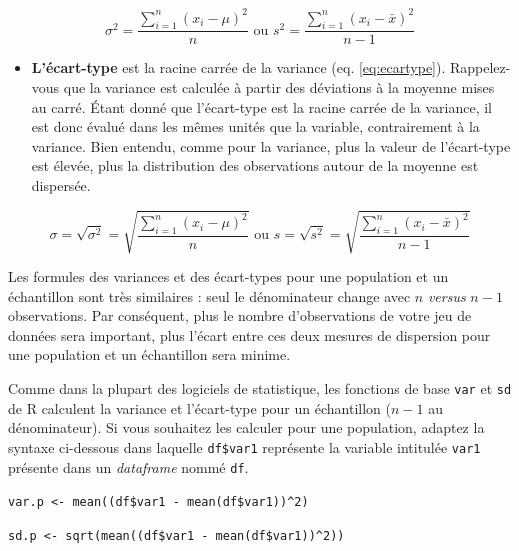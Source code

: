 \documentclass[
  11pt,
  french,
]{book}
\makeatletter
\providecommand{\tightlist}{%
  \setlength{\itemsep}{0pt}\setlength{\parskip}{0pt}}
\newenvironment{kframev}{%
\medskip{}
\setlength{\fboxsep}{.8em}
 \def\at@end@of@kframev{}%
 \ifinner\ifhmode%
  \def\at@end@of@kframev{\end{minipage}}%
  \begin{minipage}{\columnwidth}%
 \fi\fi%
 \def\FrameCommand##1{\hskip\@totalleftmargin \hskip-\fboxsep
 \colorbox{shadebluecolor}{##1}\hskip-\fboxsep
     \hskip-\linewidth \hskip-\@totalleftmargin \hskip\columnwidth}%
 \MakeFramed {\advance\hsize-\width
   \@totalleftmargin\z@ \linewidth\hsize
   \@setminipage}}%
 {\par\unskip\endMakeFramed%
 \at@end@of@kframev}
\newenvironment{rmdblock}[1]
  {
  \begin{itemize}
  \renewcommand{\labelitemi}{
    \raisebox{-.7\height}[0pt][0pt]{
      {\setkeys{Gin}{width=3em,keepaspectratio}\texttt{[image: images/\#1]}}
    }
  }
  \setlength{\fboxsep}{1em}
  \begin{kframev}
  \small
  \item
  }
  {
  \end{kframev}
  \end{itemize}
  }
\newenvironment{bloc_notes}
  {\begin{rmdblock}{notes}}
  {\end{rmdblock}}
\makeatother
\begin{document}
\footnotesize

\begin{equation}  
\sigma^2=\frac{\sum_{i=1}^n (x_{i}-\mu)^2}{n} \text{ ou } s^2=\frac{\sum_{i=1}^n (x_{i}-\bar{x})^2}{n-1}
\label{eq:variance}
\end{equation}
\normalsize

\begin{itemize}
\tightlist
\item
  \textbf{L'écart-type} est la racine carrée de la variance (eq. \eqref{eq:ecartype}). Rappelez-vous que la variance est calculée à partir des déviations à la moyenne mises au carré. Étant donné que l'écart-type est la racine carrée de la variance, il est donc évalué dans les mêmes unités que la variable, contrairement à la variance. Bien entendu, comme pour la variance, plus la valeur de l'écart-type est élevée, plus la distribution des observations autour de la moyenne est dispersée.
\end{itemize}

\footnotesize

\begin{equation}  
\sigma=\sqrt{\sigma^2}=\sqrt{\frac{\sum_{i=1}^n (x_{i}-\mu)^2}{n}} \text{ ou } s=\sqrt{s^2}=\sqrt{\frac{\sum_{i=1}^n (x_{i}-\bar{x})^2}{n-1}}
\label{eq:ecartype}
\end{equation}
\normalsize

\begin{bloc_notes}
Les formules des variances et des écart-types pour une population et un échantillon sont très similaires : seul le dénominateur change avec \(n\) \emph{versus} \(n-1\) observations. Par conséquent, plus le nombre d'observations de votre jeu de données sera important, plus l'écart entre ces deux mesures de dispersion pour une population et un échantillon sera minime.

Comme dans la plupart des logiciels de statistique, les fonctions de base \texttt{var} et \texttt{sd} de R calculent la variance et l'écart-type pour un échantillon (\(n-1\) au dénominateur). Si vous souhaitez les calculer pour une population, adaptez la syntaxe ci-dessous dans laquelle \texttt{df\$var1} représente la variable intitulée \texttt{var1} présente dans un \emph{dataframe} nommé \texttt{df}.

\texttt{var.p\ \textless{}-\ mean((df\$var1\ -\ mean(df\$var1))\^{}2)}

\texttt{sd.p\ \textless{}-\ sqrt(mean((df\$var1\ -\ mean(df\$var1))\^{}2))}

\end{bloc_notes}
\end{document}
